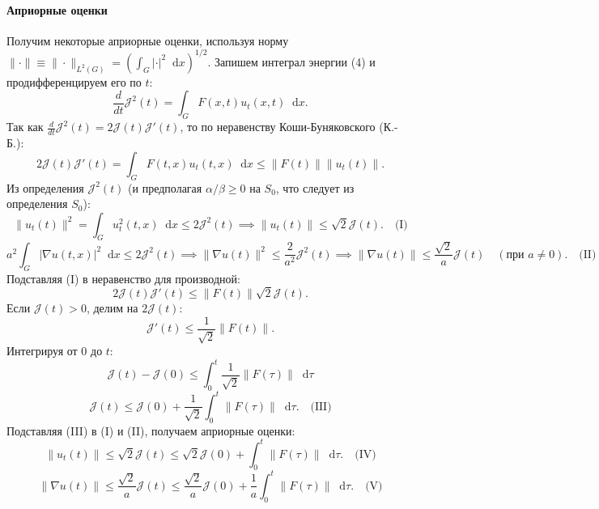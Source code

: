\documentclass[12pt, a4paper]{article}
\newcommand{\dd}{\mathop{}\!\mathrm{d}} %
\begin{document}
\paragraph*{Априорные оценки}
Получим некоторые априорные оценки, используя норму $\| \cdot \| \equiv \| \cdot \|_{L^2(G)} = \left(\int_G |\cdot|^2 \dd x\right)^{1/2}$.
Запишем интеграл энергии (4) и продифференцируем его по $t$:
$$ \frac{d}{dt} \mathcal{J}^2(t) = \int_G F(x,t) u_t(x,t) \dd x. $$
Так как $\frac{d}{dt} \mathcal{J}^2(t) = 2 \mathcal{J}(t) \mathcal{J}'(t)$, то по неравенству Коши-Буняковского (К.-Б.):
$$ 2 \mathcal{J}(t) \mathcal{J}'(t) = \int_G F(t,x) u_t(t,x) \dd x \le \|F(t)\| \|u_t(t)\|. $$
Из определения $\mathcal{J}^2(t)$ (и предполагая $\alpha/\beta \ge 0$ на $S_0$, что следует из определения $S_0$):
$$ \|u_t(t)\|^2 = \int_G u_t^2(t,x) \dd x \le 2 \mathcal{J}^2(t) \implies \|u_t(t)\| \le \sqrt{2} \mathcal{J}(t). \quad \text{(I)} $$
$$ a^2 \int_G |\nabla u(t,x)|^2 \dd x \le 2 \mathcal{J}^2(t) \implies \|\nabla u(t)\|^2 \le \frac{2}{a^2} \mathcal{J}^2(t) \implies \|\nabla u(t)\| \le \frac{\sqrt{2}}{a} \mathcal{J}(t) \quad (\text{при } a \ne 0). \quad \text{(II)} $$
Подставляя (I) в неравенство для производной:
$$ 2 \mathcal{J}(t) \mathcal{J}'(t) \le \|F(t)\| \sqrt{2} \mathcal{J}(t). $$
Если $\mathcal{J}(t) > 0$, делим на $2\mathcal{J}(t)$:
$$ \mathcal{J}'(t) \le \frac{1}{\sqrt{2}} \|F(t)\|. $$
Интегрируя от $0$ до $t$:
$$ \mathcal{J}(t) - \mathcal{J}(0) \le \int_0^t \frac{1}{\sqrt{2}} \|F(\tau)\| \dd\tau $$
$$ \mathcal{J}(t) \le \mathcal{J}(0) + \frac{1}{\sqrt{2}} \int_0^t \|F(\tau)\| \dd\tau. \quad \text{(III)} $$
Подставляя (III) в (I) и (II), получаем априорные оценки:
$$ \|u_t(t)\| \le \sqrt{2} \mathcal{J}(t) \le \sqrt{2} \mathcal{J}(0) + \int_0^t \|F(\tau)\| \dd\tau. \quad \text{(IV)} $$
$$ \|\nabla u(t)\| \le \frac{\sqrt{2}}{a} \mathcal{J}(t) \le \frac{\sqrt{2}}{a} \mathcal{J}(0) + \frac{1}{a} \int_0^t \|F(\tau)\| \dd\tau. \quad \text{(V)} $$




\setcounter{section}{1} %
\end{document}
